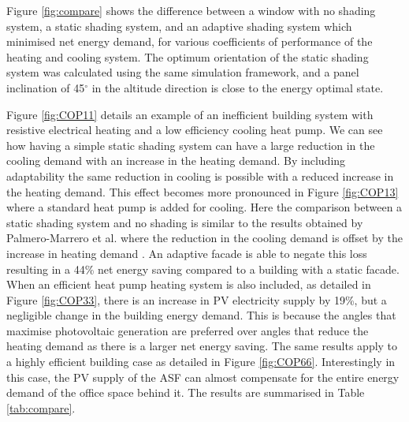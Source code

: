 
Figure \ref{fig:compare} shows the difference between a window with no shading system, a static shading system, and an adaptive shading system which minimised net energy demand, for various coefficients of performance of the heating and cooling system. The optimum orientation of the static shading system was calculated using the same simulation framework, and a panel inclination of 45$^{\circ}$ in the altitude direction is close to the energy optimal state.

Figure \ref{fig:COP11} details an example of an inefficient building system with resistive electrical heating and a low efficiency cooling heat pump. We can see how having a simple static shading system can have a large reduction in the cooling demand with an increase in the heating demand. By including adaptability the same reduction in cooling is possible with a reduced increase in the heating demand. This effect becomes more pronounced in Figure \ref{fig:COP13} where a standard heat pump is added for cooling. Here the comparison between a static shading system and no shading is similar to the results obtained by Palmero-Marrero et al. where the reduction in the cooling demand is offset by the increase in heating demand \cite{palmero2010effect}. An adaptive facade is able to negate this loss resulting in a 44\% net energy saving compared to a building with a static facade. When an efficient heat pump heating system is also included, as detailed in Figure \ref{fig:COP33}, there is an increase in PV electricity supply by 19\%, but a negligible change in the building energy demand. This is because the angles that maximise photovoltaic generation are preferred over angles that reduce the heating demand as there is a larger net energy saving. The same results apply to a highly efficient building case as detailed in Figure \ref{fig:COP66}. Interestingly in this case, the PV supply of the ASF can almost compensate for the entire energy demand of the office space behind it. The results are summarised in Table \ref{tab:compare}.



